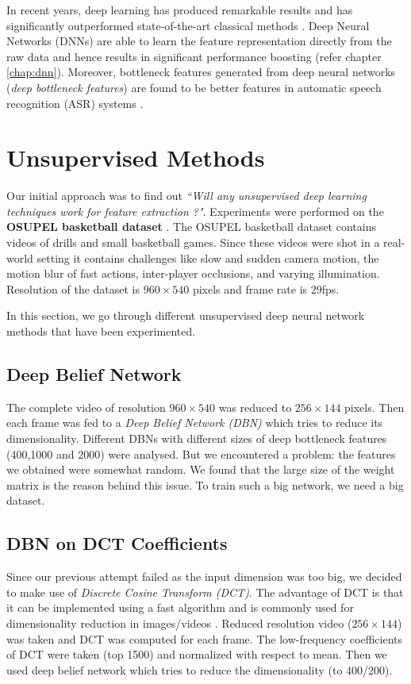 In recent years, deep learning has produced remarkable results and has significantly outperformed state-of-the-art classical methods \cite{KarpathyCVPR14}.  Deep Neural Networks (DNNs) are able to learn the feature representation directly from the raw data and hence results in significant performance boosting (refer chapter \ref{chap:dnn}).  Moreover, bottleneck features generated from deep neural networks (\textit{deep bottleneck features}) are found to be better features in automatic speech recognition (ASR) systems \cite{yu2011improved,gehring2013extracting}.

\section{Unsupervised Methods}
\label{sec:event:unsupervised}
Our initial approach was to find out \textit{``Will any unsupervised deep learning techniques work for feature extraction ?"}.  Experiments were performed on the \textbf{OSUPEL basketball dataset} \cite{brendel2011probabilistic}.  The OSUPEL basketball dataset contains videos of drills and small basketball games.  Since these videos were shot in a real-world setting it contains challenges like slow and sudden camera motion, the motion blur of fast actions, inter-player occlusions, and varying illumination.  Resolution of the dataset is $960 \times 540$ pixels and frame rate is $29$fps.

In this section, we go through different unsupervised deep neural network methods that have been experimented.

\subsection{Deep Belief Network} 
The complete video of resolution $960 \times 540$ was reduced to $256 \times 144$ pixels.  Then each frame was fed to a \textit{Deep Belief Network (DBN)} which tries to reduce its dimensionality.  Different DBNs with different sizes of deep bottleneck features (400,1000 and 2000) were analysed.  But we encountered a problem: the features we obtained were somewhat random.  We found that the large size of the weight matrix is the reason behind this issue.  To train such a big network, we need a big dataset.

\subsection{DBN on DCT Coefficients}
Since our previous attempt failed as the input dimension was too big, we decided to make use of \textit{Discrete Cosine Transform (DCT)}.  The advantage of DCT is that it can be implemented using a fast algorithm and is commonly used for dimensionality reduction in images/videos \cite{er2005high}.  Reduced resolution video ($256 \times 144$) was taken and DCT was computed for each frame.  The low-frequency coefficients of DCT were taken (top 1500) and normalized with respect to mean.  Then we used deep belief network which tries to reduce the dimensionality (to 400/200).

